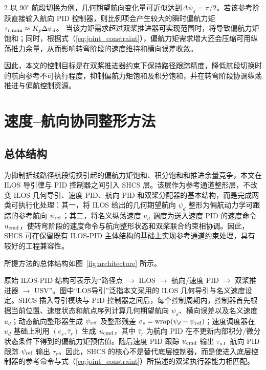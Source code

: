 \documentclass[authordraft]{ctacn}
\begin{document}
\begin{multicols}{2}
以 $90^\circ$ 航段切换为例，几何期望航向变化量可近似达到$\Delta\psi_d=\pi/2$。若该参考阶跃直接输入航向 PID 控制器，则比例项会产生较大的瞬时偏航力矩
$\tau_{r,\rm nom}\approx K_p\Delta\psi_d$。
当该力矩需求超过双桨推进器可实现范围时，将导致偏航力矩饱和；同时，根据式（\ref{eq:joint_constraint}），偏航力矩需求增大还会压缩可用纵荡推力余量，从而影响转弯阶段的速度维持和横向误差收敛。

因此，本文的控制目标是在双桨推进器约束下保持路径跟踪精度，降低航段切换时的航向参考不可执行程度，抑制偏航力矩饱和及积分饱和，并在转弯阶段协调纵荡推进与偏航控制资源。

\section{速度–航向协同整形方法}

\subsection{总体结构}
为抑制折线路径航段切换引起的偏航力矩饱和、积分饱和和推进余量竞争，本文在 ILOS 导引律与 PID 控制器之间引入 SHCS 层。该层作为参考通道整形层，不改变 ILOS 几何导引、速度 PID、航向 PID 和双桨分配器的基本结构，而是完成两类可执行化处理：其一，将 ILOS 给出的几何期望航向 $\psi_d$ 整形为偏航动力学可跟踪的参考航向 $\psi_{\rm ref}$；其二，将名义纵荡速度 $u_d$ 调度为送入速度 PID 的速度命令 $u_{\rm cmd}$，使转弯阶段的速度命令与航向整形状态和双桨联合约束相协调。因此，SHCS 可在保留既有 ILOS-PID 主体结构的基础上实现参考通道约束处理，具有较好的工程兼容性。

所提方法的总体结构如图~\ref{fig:architecture} 所示。

原始 ILOS-PID 结构可表示为“路径点 $\rightarrow$ ILOS $\rightarrow$ 航向/速度 PID $\rightarrow$ 双桨推进器 $\rightarrow$ USV”。图中“LOS导引”泛指本文采用的 ILOS 几何导引与名义速度设定。SHCS 插入导引模块与 PID 控制器之间后，每个控制周期内，控制器首先根据当前位置、速度状态和航点序列计算几何期望航向 $\psi_d$、横向误差以及名义速度 $u_d$；动态航向整形器生成 $\psi_{\rm ref}$ 及整形残差 $e_s=\mathrm{wrap}(\psi_d-\psi_{\rm ref})$；速度调度器在 $u_d$ 基础上利用 $(e_s,\hat{\tau}_r)$ 生成 $u_{\rm cmd}$，其中 $\hat{\tau}_r$ 为航向 PID 在不更新内部积分/微分状态条件下得到的偏航力矩预估值。随后速度 PID 跟踪 $u_{\rm cmd}$ 输出 $\tau_u$，航向 PID 跟踪 $\psi_{\rm ref}$ 输出 $\tau_r$。因此，SHCS 的核心不是替代底层控制器，而是使进入底层控制器的参考命令与式（\ref{eq:joint_constraint}）所描述的双桨执行器能力相匹配。

\end{multicols}
\end{document}
